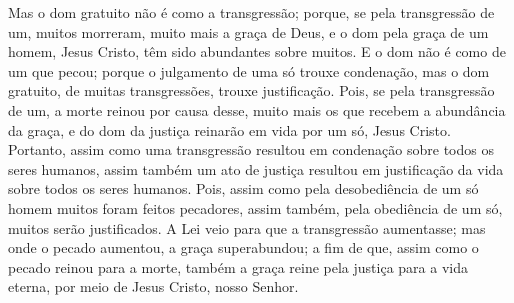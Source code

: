 {Mas o dom gratuito não é como a transgressão; porque, se pela transgressão de um, muitos morreram, muito mais a graça de Deus, e o dom pela graça de um homem, Jesus Cristo, têm sido abundantes sobre muitos.
E o dom não é como
{} de um que pecou; porque o julgamento de uma só
{} trouxe condenação, mas o dom gratuito, de muitas transgressões, trouxe justificação.
Pois, se pela transgressão de um, a morte reinou por causa desse, muito mais os que recebem a abundância da graça, e do dom da justiça reinarão em vida por um só, Jesus Cristo.
Portanto, assim como uma transgressão resultou em condenação sobre todos os seres humanos, assim também um ato de justiça resultou em justificação da vida sobre todos os seres humanos.
Pois, assim como pela desobediência de um só homem muitos foram feitos pecadores, assim também, pela obediência de um só, muitos serão justificados.
A Lei veio para que a transgressão aumentasse; mas onde o pecado aumentou, a graça superabundou;
a fim de que, assim como o pecado reinou para a morte, também a graça reine pela justiça para a vida eterna, por meio de Jesus Cristo, nosso Senhor.

}
